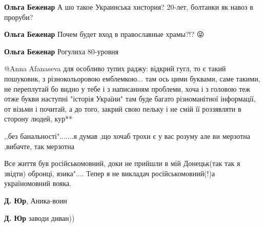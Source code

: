 \begin{itemize}
\begin{itemize}
\textbf{Ольга Беженар} А шо такое Украинська хистория? 20-лет, болтанки як навоз в проруби?


\textbf{Ольга Беженар} Почем будет вход в православные храмы?!? 😜


\textbf{Ольга Беженар} Рогулиха 80-уровня🤣🤣



@Anna Afanaseva для особливо тупих раджу: відкрий гугл, то є такий пошуковик, з
різнокольоровою емблемкою... там ось цими буквами, саме такими, не переплутай
бо видно у тебе і з написанням проблеми, хоча і з головою теж 🤔 отже букви
наступні "історія України" там буде багато різноманітної інформації, от візьми
і почитай, а до того, закрий свою пельку і не смій її роззявляти в сторону
людей, кур**
\end{itemize}

\end{itemize}


,,без банальності".......я думав ,що хочаб трохи є у вас розуму але ви мерзотна ,вибачте, так мерзотна




Все життя був російськомовний, доки не прийшли в мій Донецьк(так так я звідти)
обронці, язика".... Тепер я не викладач російськомовний(!)а україномовний
вояка.

\begin{itemize}

\textbf{Д. Юр}, Аника-воин


\textbf{Д. Юр} заводи диван))
\end{itemize}

